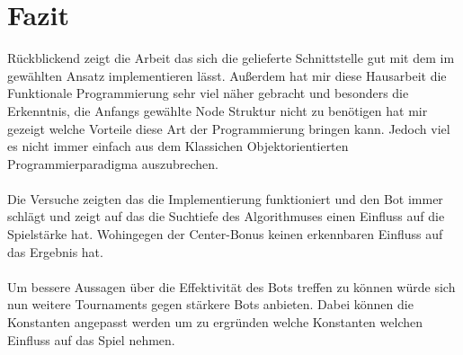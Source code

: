 %

\section{Fazit}

Rückblickend zeigt die Arbeit das sich die gelieferte Schnittstelle gut mit dem im gewählten Ansatz implementieren lässt. Außerdem hat mir diese Hausarbeit die Funktionale Programmierung sehr viel näher gebracht und besonders die Erkenntnis, die Anfangs gewählte Node Struktur nicht zu benötigen hat mir gezeigt welche Vorteile diese Art der Programmierung bringen kann. Jedoch viel es nicht immer einfach aus dem Klassichen Objektorientierten Programmierparadigma auszubrechen.
\\\\
Die Versuche zeigten das die Implementierung funktioniert und den Bot immer schlägt und zeigt auf das die Suchtiefe des Algorithmuses einen Einfluss auf die Spielstärke hat. Wohingegen der Center-Bonus keinen erkennbaren Einfluss auf das Ergebnis hat.
\\\\
Um bessere Aussagen über die Effektivität des Bots treffen zu können würde sich nun weitere Tournaments gegen stärkere Bots anbieten. Dabei können die Konstanten angepasst werden um zu ergründen welche Konstanten welchen Einfluss auf das Spiel nehmen.
\newpage